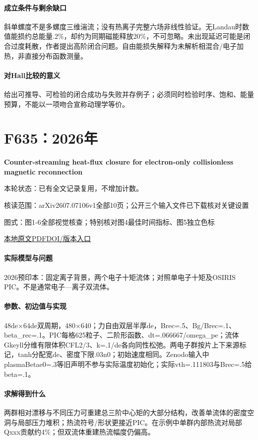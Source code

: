 \paragraph{成立条件与剩余缺口}斜单螺度不是多螺度三维湍流；没有热离子完整六场非线性验证。无Landau时数值能损约总能量.2\%，却约为同期磁能释放20\%，不可忽略。未出现延迟可能是闭合过度耗散，作者提出高阶闭合问题。自由能损失解释为未解析相混合/电子加热，非直接分布函数测量。

\paragraph{对Hall比较的意义}给出可推导、可检验的闭合成功与失败并存例子；必须同时检验时序、饱和、能量预算，不能以一项吻合宣称动理学等价。

\section{F635：2026年}\label{paper:F635}

\textbf{Counter-streaming heat-flux closure for electron-only collisionless magnetic reconnection}\citep{F635}

\textsf{本轮状态：}已有全文记录复用，不增加计数。

\textsf{核读范围：}arXiv2607.07106v1全部10页；公开三个输入文件已下载核对关键设置\par\textsf{图式：}图1-6全部视觉核查；特别核对图4最佳时间指标、图5独立色标

\href{run:../../papers/F635.pdf}{本地原文PDF}\quad\href{https://doi.org/10.48550/arxiv.2607.07106}{DOI/版本入口}

\paragraph{实际模型与问题}2026预印本：固定离子背景，两个电子十矩流体；对照单电子十矩及OSIRIS PIC。不是通常电子—离子双流体。

\paragraph{参数、初边值与实现}48de×64de双周期，480×640；力自由双层半厚de，Brec=.5、Bg/Brec=.1、beta\_rec=.1。PIC每格625粒子、二阶形函数、dt=.066667/omega\_pe；流体Gkeyll分维有限体积CFL2/3、k=.1/de各向同性松弛。两电子群按片上下来源标记，tanh分配宽de、密度下限.03n0；初始速度相同。Zenodo输入中plasmaBetae0=.3等旧声明不参与实际温度初始化；实际vth=.111803与Brec=.5给beta=.1。

\paragraph{求解得到什么}两群相对漂移与不同压力可重建总三阶中心矩的大部分结构，改善单流体的密度空洞与局部压力堆积；热流符号/形状更接近PIC。在示例中单群内部热流对局部Qxxx贡献约4\%；但双流体重建热流幅度仍偏高。


